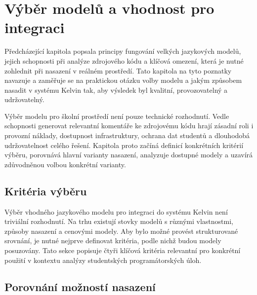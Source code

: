 \chapter{Výběr modelů a vhodnost pro integraci}
\label{ch:selection}

Předcházející kapitola popsala principy fungování velkých jazykových modelů, jejich schopnosti při analýze zdrojového kódu a klíčová omezení, která je nutné zohlednit při nasazení v reálném prostředí.
Tato kapitola na tyto poznatky navazuje a zaměřuje se na praktickou otázku volby modelu a jakým způsobem nasadit v systému Kelvin tak, aby výsledek byl kvalitní, provozovatelný a udržovatelný.

Výběr modelu pro školní prostředí není pouze technické rozhodnutí.
Vedle schopnosti generovat relevantní komentáře ke zdrojovému kódu hrají zásadní roli i provozní náklady, dostupnost infrastruktury, ochrana dat studentů a dlouhodobá udržovatelnost celého řešení.
Kapitola proto začíná definicí konkrétních kritérií výběru, porovnává hlavní varianty nasazení, analyzuje dostupné modely a uzavírá zdůvodněnou volbou konkrétní varianty.

\section{Kritéria výběru}
\label{sec:selection-criteria}

Výběr vhodného jazykového modelu pro integraci do systému Kelvin není triviální rozhodnutí.
Na trhu existují stovky modelů s různými vlastnostmi, způsoby nasazení a cenovými modely.
Aby bylo možné provést strukturované srovnání, je nutné nejprve definovat kritéria, podle nichž budou modely posuzovány.
Tato sekce popisuje čtyři klíčová kritéria relevantní pro konkrétní použití v kontextu analýzy studentských programátorských úloh.






\section{Porovnání možností nasazení}
\label{sec:selection-deployment}

